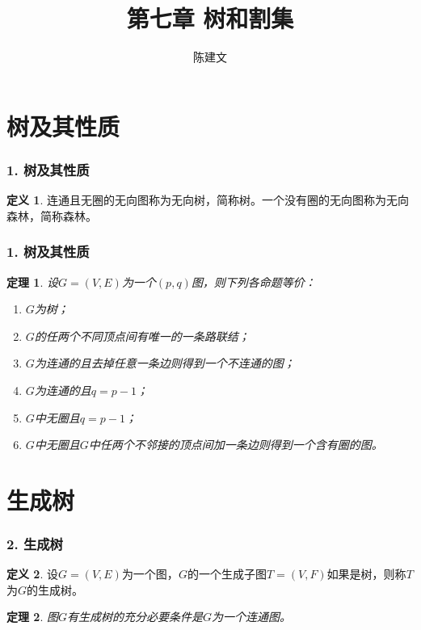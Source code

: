 \documentclass{beamer}
\begin{document}
\begin{CJK*}{UTF8}{gbsn}

\newtheorem{Thm}{定理}[section]
\theoremstyle{definition}
\newtheorem{Def}{定义}[section]
\theoremstyle{example}
\newtheorem*{Ex}{例：}
\date{}
\author{陈建文}

\title{第七章 树和割集}
\begin{frame}
  \titlepage
\end{frame}  
\section{树及其性质}
\begin{frame}
  \frametitle{1. 树及其性质}
  \begin{Def}
    连通且无圈的无向图称为无向树，简称\alert{树}。\pause 一个没有圈的无向图称为无向森林，简称\alert{森林}。
  \end{Def}
\end{frame}
\begin{frame}
  \frametitle{1. 树及其性质}
\begin{Thm}
  设$G=(V,E)$为一个$(p,q)$图，则下列各命题等价：
  \begin{enumerate}[(1)]
  \item $G$为树；
  \item $G$的任两个不同顶点间有唯一的一条路联结；
  \item $G$为连通的且去掉任意一条边则得到一个不连通的图；
  \item $G$为连通的且$q = p - 1$；
  \item $G$中无圈且$q = p - 1$；
    \item $G$中无圈且$G$中任两个不邻接的顶点间加一条边则得到一个含有圈的图。
  \end{enumerate}
\end{Thm}  
\end{frame}

\section{生成树}


\begin{frame}
  \frametitle{2. 生成树}
  \begin{Def}
    设$G=(V,E)$为一个图，$G$的一个生成子图$T=(V,F)$如果是树，则称$T$为$G$的\alert{生成树}。
  \end{Def}\pause
  \begin{Thm}
    图$G$有生成树的充分必要条件是$G$为一个连通图。
  \end{Thm}
\end{frame}

\end{CJK*}
\end{document}
